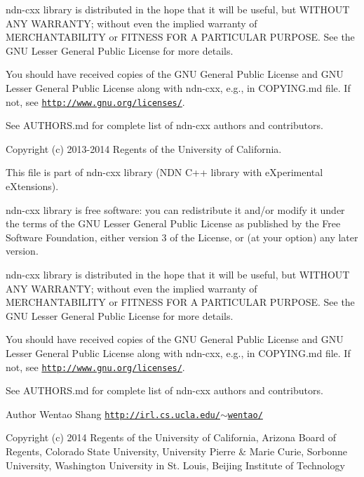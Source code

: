 ndn-\/cxx library is distributed in the hope that it will be useful, but W\+I\+T\+H\+O\+UT A\+NY W\+A\+R\+R\+A\+N\+TY; without even the implied warranty of M\+E\+R\+C\+H\+A\+N\+T\+A\+B\+I\+L\+I\+TY or F\+I\+T\+N\+E\+SS F\+OR A P\+A\+R\+T\+I\+C\+U\+L\+AR P\+U\+R\+P\+O\+SE. See the G\+NU Lesser General Public License for more details.

You should have received copies of the G\+NU General Public License and G\+NU Lesser General Public License along with ndn-\/cxx, e.\+g., in C\+O\+P\+Y\+I\+N\+G.\+md file. If not, see \href{http://www.gnu.org/licenses/}{\tt http\+://www.\+gnu.\+org/licenses/}.

See A\+U\+T\+H\+O\+R\+S.\+md for complete list of ndn-\/cxx authors and contributors.

Copyright (c) 2013-\/2014 Regents of the University of California.

This file is part of ndn-\/cxx library (N\+DN C++ library with e\+Xperimental e\+Xtensions).

ndn-\/cxx library is free software\+: you can redistribute it and/or modify it under the terms of the G\+NU Lesser General Public License as published by the Free Software Foundation, either version 3 of the License, or (at your option) any later version.

ndn-\/cxx library is distributed in the hope that it will be useful, but W\+I\+T\+H\+O\+UT A\+NY W\+A\+R\+R\+A\+N\+TY; without even the implied warranty of M\+E\+R\+C\+H\+A\+N\+T\+A\+B\+I\+L\+I\+TY or F\+I\+T\+N\+E\+SS F\+OR A P\+A\+R\+T\+I\+C\+U\+L\+AR P\+U\+R\+P\+O\+SE. See the G\+NU Lesser General Public License for more details.

You should have received copies of the G\+NU General Public License and G\+NU Lesser General Public License along with ndn-\/cxx, e.\+g., in C\+O\+P\+Y\+I\+N\+G.\+md file. If not, see \href{http://www.gnu.org/licenses/}{\tt http\+://www.\+gnu.\+org/licenses/}.

See A\+U\+T\+H\+O\+R\+S.\+md for complete list of ndn-\/cxx authors and contributors.

\begin{DoxyAuthor}{Author}
Wentao Shang \href{http://irl.cs.ucla.edu/~wentao/}{\tt http\+://irl.\+cs.\+ucla.\+edu/$\sim$wentao/}
\end{DoxyAuthor}
Copyright (c) 2014 Regents of the University of California, Arizona Board of Regents, Colorado State University, University Pierre \& Marie Curie, Sorbonne University, Washington University in St. Louis, Beijing Institute of Technology


